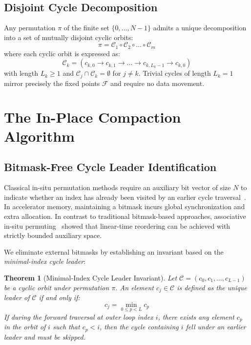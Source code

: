 \documentclass[journal,10pt,twocolumn]{article}
\newtheorem{theorem}{Theorem}
\begin{document}
\subsection{Disjoint Cycle Decomposition}
Any permutation $\pi$ of the finite set $\{0, \dots, N-1\}$ admits a unique decomposition into a set of mutually disjoint cyclic orbits:
\begin{equation}
    \pi = \mathcal{C}_1 \circ \mathcal{C}_2 \circ \dots \circ \mathcal{C}_m
\end{equation}
where each cyclic orbit is expressed as:
\begin{equation}
    \mathcal{C}_k = (c_{k,0} \to c_{k,1} \to \dots \to c_{k,L_k-1} \to c_{k,0})
\end{equation}
with length $L_k \ge 1$ and $\mathcal{C}_j \cap \mathcal{C}_k = \emptyset$ for $j \ne k$. Trivial cycles of length $L_k = 1$ mirror precisely the fixed points $\mathcal{F}$ and require no data movement.

\section{The In-Place Compaction Algorithm}
\label{sec:algorithm}

\subsection{Bitmask-Free Cycle Leader Identification}
Classical in-situ permutation methods require an auxiliary bit vector of size $N$ to indicate whether an index has already been visited by an earlier cycle traversal~\cite{knuth1998art}. In accelerator memory, maintaining a bitmask incurs global synchronization and extra allocation. In contrast to traditional bitmask-based approaches, associative in-situ permuting~\cite{cetin2013insitu, cetin2013inplace} showed that linear-time reordering can be achieved with strictly bounded auxiliary space.

We eliminate external bitmasks by establishing an invariant based on the \textit{minimal-index cycle leader}:
\begin{theorem}[Minimal-Index Cycle Leader Invariant]
Let $\mathcal{C} = (c_0, c_1, \dots, c_{L-1})$ be a cyclic orbit under permutation $\pi$. An element $c_j \in \mathcal{C}$ is defined as the unique leader of $\mathcal{C}$ if and only if:
\begin{equation}
    c_j = \min_{0 \le p < L} c_p
\end{equation}
If during the forward traversal at outer loop index $i$, there exists any element $c_p$ in the orbit of $i$ such that $c_p < i$, then the cycle containing $i$ fell under an earlier leader and must be skipped.
\end{theorem}
\end{document}
